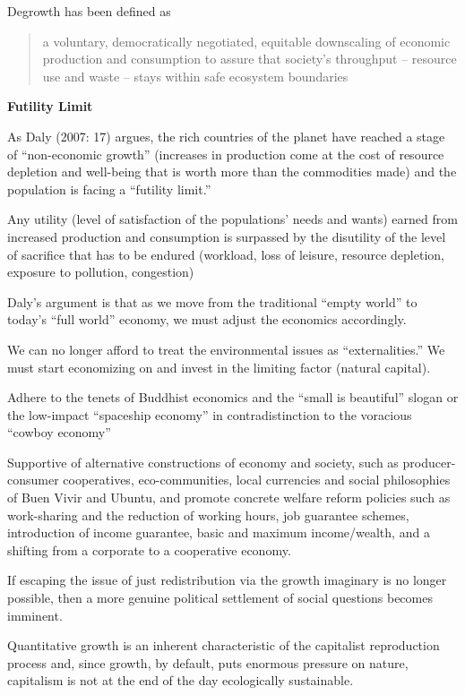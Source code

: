 \documentclass[
]{book}
\begin{document}
Degrowth has been defined as

\begin{quote}
a voluntary, democratically negotiated, equitable downscaling of
economic production and consumption to assure that society's throughput -- resource use and waste -- stays within safe ecosystem boundaries
\end{quote}

\textbf{Futility Limit}

As Daly (2007: 17) argues, the rich
countries of the planet have reached a stage of ``non-economic growth'' (increases in production come at the
cost of resource depletion and well-being that is worth more than the commodities made) and the population is
facing a ``futility limit.''

Any utility (level of satisfaction of the populations' needs and wants) earned
from increased production and consumption is surpassed by the disutility of the level of sacrifice that has to be
endured (workload, loss of leisure, resource depletion, exposure to pollution, congestion)

Daly's argument is that as we move from the
traditional ``empty world'' to today's ``full world'' economy, we must adjust the economics accordingly.

We can no longer afford to treat the environmental issues as ``externalities.''
We must start economizing on and invest in the limiting factor (natural
capital).

Adhere to the tenets of Buddhist economics and the ``small is beautiful'' slogan
or the low-impact ``spaceship economy'' in contradistinction
to the voracious ``cowboy economy''

Supportive of alternative constructions of economy and society, such
as producer-consumer cooperatives, eco-communities, local currencies and social philosophies of Buen Vivir
and Ubuntu, and promote concrete welfare reform policies such as work-sharing and the reduction of working
hours, job guarantee schemes, introduction of income guarantee, basic and maximum income/wealth, and a shifting from a corporate to a cooperative economy.

If escaping the issue of just redistribution via the growth imaginary is no longer possible,
then a more genuine political settlement of social questions becomes imminent.

Quantitative growth is an inherent characteristic of the capitalist reproduction process
and, since growth, by default, puts enormous pressure on nature, capitalism is not at the end of the day ecologically sustainable.
\end{document}
